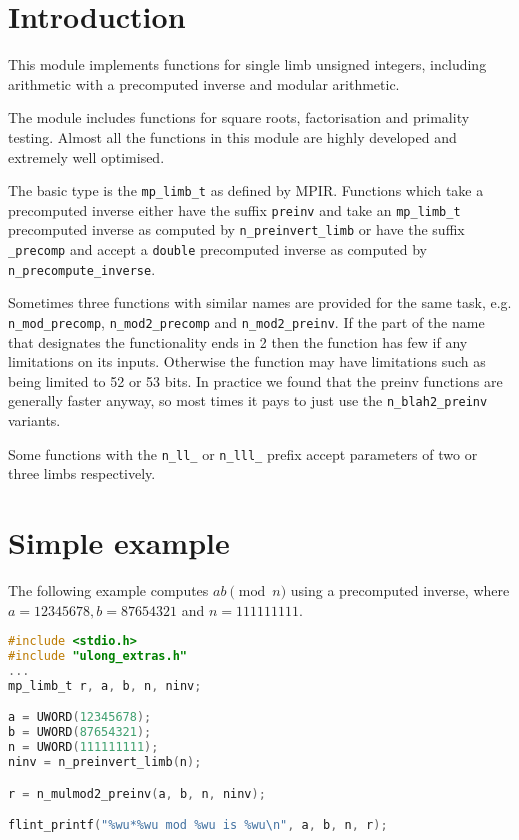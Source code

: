 \documentclass[a4paper,10pt]{book}
\newcommand{\code}{\lstinline}
\begin{document}
{{\section{Introduction}

This module implements functions for single limb unsigned integers,
including arithmetic with a precomputed inverse and modular arithmetic.

The module includes functions for square roots, factorisation and
primality testing. Almost all the functions in this module are highly
developed and extremely well optimised.

The basic type is the \code{mp_limb_t} as defined by MPIR. Functions
which take a precomputed inverse either have the suffix \code{preinv}
and take an \code{mp_limb_t} precomputed inverse as computed by
\code{n_preinvert_limb} or have the suffix \code{_precomp} and accept
a \code{double} precomputed inverse as computed by
\code{n_precompute_inverse}.

Sometimes three functions with similar names are provided for the
same task, e.g. \code{n_mod_precomp}, \code{n_mod2_precomp} and
\code{n_mod2_preinv}. If the part of the name that designates the
functionality ends in 2 then the function has few if any limitations
on its inputs. Otherwise the function may have limitations such as
being limited to 52 or 53 bits. In practice we found that the
preinv functions are generally faster anyway, so most times it pays
to just use the \code{n_blah2_preinv} variants.

Some functions with the \code{n_ll_} or \code{n_lll_} prefix accept
parameters of two or three limbs respectively.

\section{Simple example}

The following example computes $ab \pmod{n}$ using a precomputed
inverse, where $a = 12345678, b = 87654321$ and $n = 111111111$.

\begin{lstlisting}[language=c]
#include <stdio.h>
#include "ulong_extras.h"
...
mp_limb_t r, a, b, n, ninv;

a = UWORD(12345678);
b = UWORD(87654321);
n = UWORD(111111111);
ninv = n_preinvert_limb(n);

r = n_mulmod2_preinv(a, b, n, ninv);

flint_printf("%wu*%wu mod %wu is %wu\n", a, b, n, r);
\end{lstlisting}

}}
\end{document}
